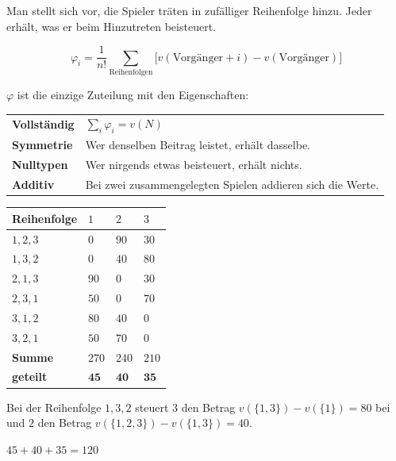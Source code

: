 \begin{merksatz}
Man stellt sich vor, die Spieler träten in zufälliger Reihenfolge hinzu. Jeder erhält, was er beim Hinzutreten beisteuert.

\begin{center}
\begin{minipage}{0.9\textwidth}
\[ \varphi_i = \frac{1}{n!}\sum_{\text{Reihenfolgen}} \bigl[v(\text{Vorgänger}+i) - v(\text{Vorgänger})\bigr] \]
\end{minipage}
\end{center}

$\varphi$ ist die einzige Zuteilung mit den Eigenschaften:
\begin{center}
{\small
\renewcommand{\arraystretch}{1.5}
\begin{tabular}{@{}P{2.4cm}P{6.2cm}@{}}
\toprule
\textbf{Vollständig} & $\sum_i \varphi_i = v(N)$\\
\textbf{Symmetrie} & Wer denselben Beitrag leistet, erhält dasselbe.\\
\textbf{Nulltypen} & Wer nirgends etwas beisteuert, erhält nichts.\\
\textbf{Additiv} & Bei zwei zusammengelegten Spielen addieren sich die Werte.\\
\bottomrule
\end{tabular}}
\end{center}

\begin{center}
{\small
\renewcommand{\arraystretch}{1.46}
\begin{tabular}{@{}P{2.4cm}P{1.4cm}P{1.4cm}P{1.4cm}@{}}
\toprule
\textbf{Reihen\-folge} & $1$ & $2$ & $3$\\
\midrule
$1,2,3$ & $0$ & $90$ & $30$\\
$1,3,2$ & $0$ & $40$ & $80$\\
$2,1,3$ & $90$ & $0$ & $30$\\
$2,3,1$ & $50$ & $0$ & $70$\\
$3,1,2$ & $80$ & $40$ & $0$\\
$3,2,1$ & $50$ & $70$ & $0$\\
\midrule
\textbf{Summe} & $270$ & $240$ & $210$\\
\textbf{geteilt} & $\mathbf{45}$ & $\mathbf{40}$ & $\mathbf{35}$\\
\bottomrule
\end{tabular}}
\end{center}

 Bei der Reihenfolge $1,3,2$ steuert $3$ den Betrag $v(\{1,3\})-v(\{1\}) = 80$ bei und $2$ den Betrag $v(\{1,2,3\})-v(\{1,3\}) = 40$.

 $45+40+35 = 120$ \checkmark
\end{merksatz}


